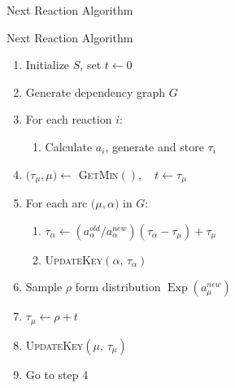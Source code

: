 \documentclass{beamer}
\DeclareMathOperator{\Exp}{\text{Exp}}
\begin{document}
\begin{frame}{Next Reaction Algorithm}
  \begin{block}{Next Reaction Algorithm}
    \begin{enumerate}
    \item Initialize $S$, set $t\leftarrow 0$
    \item Generate dependency graph $G$
    \item For each reaction $i$:
      \begin{enumerate}
      \item Calculate $a_i$, generate and store $\tau_i$
      \end{enumerate}
    \item $\bigl(\tau_\mu, \mu\bigr) \leftarrow$ \textsc{GetMin}$(), \quad t \leftarrow \tau_\mu$
    \item For each arc $\bigl(\mu, \alpha\bigr)$ in $G$:
      \begin{enumerate}
      \item $\tau_\alpha \leftarrow \left(a^{old}_\alpha \big/ a^{new}_\alpha\right)
        \left(\tau_\alpha - \tau_\mu\right) + \tau_\mu$
      \item \textsc{UpdateKey}$\left(\alpha, \, \tau_\alpha\right)$
      \end{enumerate}
    \item Sample $\rho$ form distribution $\Exp\left(a^{new}_\mu\right)$
    \item $\tau_\mu \leftarrow \rho + t$
    \item \textsc{UpdateKey}$\left(\mu, \, \tau_\mu\right)$
    \item Go to step 4
    \end{enumerate}
  \end{block}
\end{frame}
\end{document}
